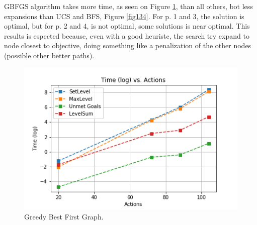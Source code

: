 \documentclass[a4paper]{article}
\begin{document}


        
GBFGS algorithm takes more time, as seen on Figure \ref{fig131}, than all others, bot less expansions than UCS and BFS, Figure \ref{fig134}. For p. 1 and 3, the solution is optimal, but for p. 2 and 4, is not optimal, some solutions is near optimal. This results is espected because, even with a good heuristc, the search try expand to node closest to objective, doing something like a penalization of the other nodes (possible other better paths). 

\begin{figure}[htpb]
\begin{center}
\includegraphics[width=1\columnwidth]{fig/results_131.png}
\caption{Greedy Best First Graph.}
\end{center}
\label{fig131}
\end{figure}
\end{document}

